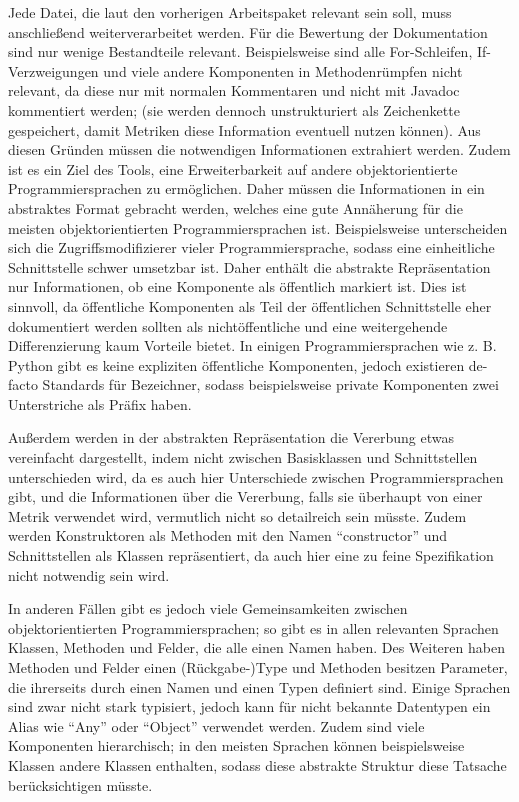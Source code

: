 Jede Datei, die laut den vorherigen Arbeitspaket relevant sein soll, muss anschließend weiterverarbeitet werden. Für die Bewertung der Dokumentation sind nur wenige Bestandteile relevant. Beispielsweise sind alle For-Schleifen, If-Verzweigungen und viele andere Komponenten in Methodenrümpfen nicht relevant, da diese nur mit normalen Kommentaren und nicht mit Javadoc kommentiert werden; (sie werden dennoch unstrukturiert als Zeichenkette gespeichert, damit Metriken diese Information eventuell nutzen können). Aus diesen Gründen müssen die notwendigen Informationen extrahiert werden. Zudem ist es ein Ziel des Tools, eine Erweiterbarkeit auf andere objektorientierte Programmiersprachen zu ermöglichen. Daher müssen die Informationen in ein abstraktes Format gebracht werden, welches eine gute Annäherung für die meisten objektorientierten Programmiersprachen ist. Beispielsweise unterscheiden sich die Zugriffsmodifizierer vieler Programmiersprache, sodass eine einheitliche Schnittstelle schwer umsetzbar ist. Daher enthält die abstrakte Repräsentation nur Informationen, ob eine Komponente als öffentlich markiert ist. Dies ist sinnvoll, da öffentliche Komponenten als Teil der öffentlichen Schnittstelle eher dokumentiert werden sollten als nichtöffentliche und eine weitergehende Differenzierung kaum Vorteile bietet. In einigen Programmiersprachen wie z. B. Python gibt es keine expliziten öffentliche Komponenten, jedoch existieren de-facto Standards für Bezeichner, sodass beispielsweise private Komponenten zwei Unterstriche als Präfix haben.

Außerdem werden in der abstrakten Repräsentation die Vererbung etwas vereinfacht dargestellt, indem nicht zwischen Basisklassen und Schnittstellen unterschieden wird, da es auch hier Unterschiede zwischen Programmiersprachen gibt, und die Informationen über die Vererbung, falls sie überhaupt von einer Metrik verwendet wird, vermutlich nicht so detailreich sein müsste. Zudem werden Konstruktoren als Methoden mit den Namen \enquote{constructor} und Schnittstellen als Klassen repräsentiert, da auch hier eine zu feine Spezifikation nicht notwendig sein wird.  

  

In anderen Fällen gibt es jedoch viele Gemeinsamkeiten zwischen objektorientierten Programmiersprachen; so gibt es in  allen relevanten Sprachen Klassen, Methoden und Felder, die alle einen Namen haben. Des Weiteren haben Methoden und Felder einen (Rückgabe-)Type und Methoden besitzen Parameter, die ihrerseits durch einen Namen und einen Typen definiert sind. Einige Sprachen sind zwar nicht stark typisiert, jedoch kann für nicht bekannte Datentypen ein Alias wie \enquote{Any} oder  \enquote{Object} verwendet werden.  Zudem sind viele Komponenten hierarchisch; in den meisten Sprachen können beispielsweise Klassen andere Klassen enthalten, sodass diese abstrakte Struktur diese Tatsache berücksichtigen müsste. 

